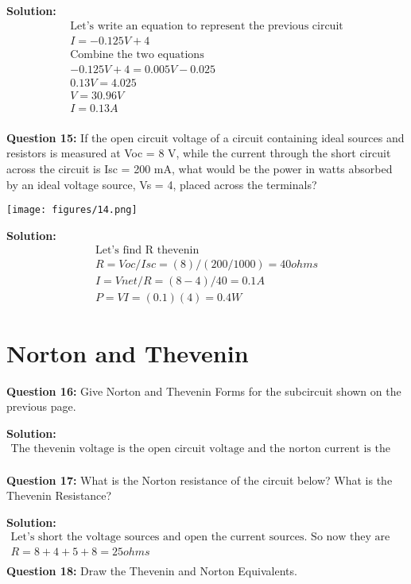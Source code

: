 \documentclass{article}
\begin{document}
\textbf{Solution:}
\begin{align*}
    \text{Let's write an equation to represent the previous circuit}\\
    I = -0.125V +4\\
     \text{Combine the two equations}\\
    -0.125V +4 = 0.005V - 0.025\\
    0.13V  = 4.025\\
    V = \boxed{30.96 V}\\
    I = \boxed{0.13 A}\\
\end{align*}

\textbf{Question 15:} If the open circuit voltage of a circuit containing ideal sources and resistors is measured at Voc = 8 V, while the current through the short circuit across the circuit is Isc = 200 mA, what would be the power in watts absorbed by an ideal voltage source, Vs = 4, placed across the terminals?

\begin{center}
    \texttt{[image: figures/14.png]}

\end{center}

\textbf{Solution:}
\begin{align*}
    \text{Let's find R thevenin}\\
   R = Voc/Isc = (8)/(200/1000) = 40 ohms\\
   I = Vnet/R = (8 -4)/40 = 0.1 A\\
   P = VI = (0.1)(4) = \boxed{0.4 W}
\end{align*}



\section*{Norton and Thevenin}
\textbf{Question 16:} Give Norton and Thevenin Forms for the subcircuit shown on the previous page.

\textbf{Solution: }
\begin{align*}
    \text{The thevenin voltage is the open circuit voltage and the norton current is the short circuit current}\\
\end{align*}

\textbf{Question 17:} What is the Norton resistance of the circuit below? What is the Thevenin Resistance?

\textbf{Solution:}
\begin{align*}
    \text{Let's short the voltage sources and open the current sources. So now they are in series}\\
  R = 8 + 4 + 5 + 8 = \boxed{25 ohms}\\
\end{align*}
\textbf{Question 18:} Draw the Thevenin and Norton Equivalents.
\end{document}
